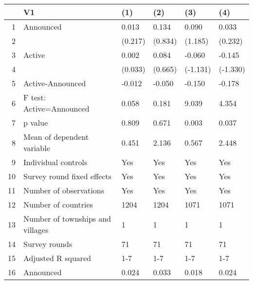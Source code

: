 \begin{table}[ht]
\centering
\begin{tabular}{rlllll}
  \hline
 & V1 & (1) & (2) & (3) & (4) \\ 
  \hline
1 & Announced & 0.013 & 0.134 & 0.090 & 0.033 \\ 
  2 &  & (0.217) & (0.834) & (1.185) & (0.232) \\ 
  3 & Active & 0.002 & 0.084 & -0.060 & -0.145 \\ 
  4 &  & (0.033) & (0.665) & (-1.131) & (-1.330) \\ 
  5 & Active-Announced & -0.012 & -0.050 & -0.150 & -0.178 \\ 
  6 & F test: Active=Announced & 0.058 & 0.181 & 9.039 & 4.354 \\ 
  7 & p value & 0.809 & 0.671 & 0.003 & 0.037 \\ 
  8 & Mean of dependent variable & 0.451 & 2.136 & 0.567 & 2.448 \\ 
  9 & Individual controls & Yes & Yes & Yes & Yes \\ 
  10 & Survey round fixed effects & Yes & Yes & Yes & Yes \\ 
  11 & Number of observations & Yes & Yes & Yes & Yes \\ 
  12 & Number of countries & 1204 & 1204 & 1071 & 1071 \\ 
  13 & Number of townships and villages & 1 & 1 & 1 & 1 \\ 
  14 & Survey rounds & 71 & 71 & 71 & 71 \\ 
  15 & Adjusted R squared & 1-7 & 1-7 & 1-7 & 1-7 \\ 
  16 & Announced & 0.024 & 0.033 & 0.018 & 0.024 \\ 
   \hline
\end{tabular}
\end{table}
